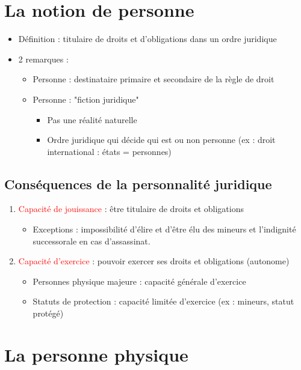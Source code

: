 \section{La notion de personne}
\begin{itemize}
    \item Définition : titulaire de droits et d'obligations dans un ordre juridique
    \item 2 remarques :
    \begin{itemize}
        \item Personne : destinataire primaire et secondaire de la règle de droit
        \item Personne : "fiction juridique"
        \begin{itemize}
            \item Pas une réalité naturelle
            \item Ordre juridique qui décide qui est ou non personne (ex : droit international : états = personnes)
        \end{itemize}
    \end{itemize}
\end{itemize}

\subsection{Conséquences de la personnalité juridique}

\begin{enumerate}
    \item \textcolor{red}{Capacité de jouissance} : être titulaire de droits et obligations
    \begin{itemize}
        \item Exceptions : impossibilité d'élire et d'être élu des mineurs et l'indignité successorale en cas d'assassinat.
    \end{itemize}
    \item \textcolor{red}{Capacité d'exercice} : pouvoir exercer ses droits et obligations (autonome)
    \begin{itemize}
        \item Personnes physique majeure : capacité générale d'exercice
        \item Statuts de protection : capacité limitée d'exercice (ex : mineurs, statut protégé)
    \end{itemize}
\end{enumerate}

\section{La personne physique}

